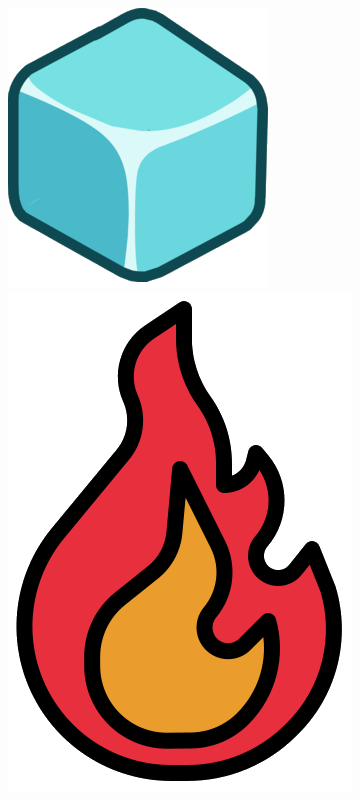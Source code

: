 \documentclass[11pt, a5paper]{article}
\begin{document}
	\begin{minipage}{\textwidth}
		\includegraphics[scale=0.3]{icei}  \hspace{5cm}
		\includegraphics[scale=0.075]{firef} 
	\end{minipage}
	
\end{document}
